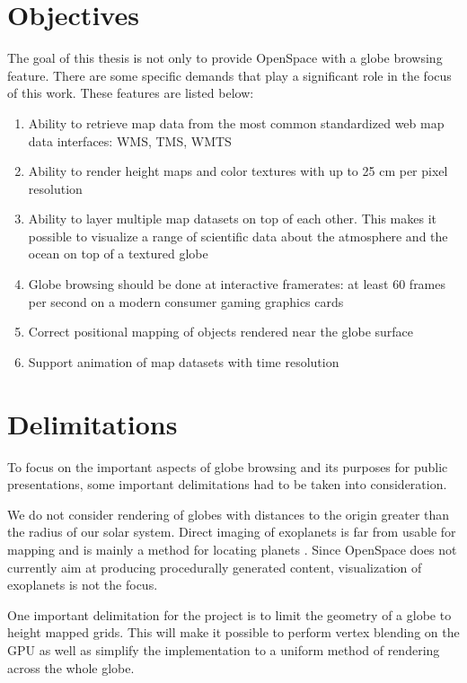 \section{Objectives}

The goal of this thesis is not only to provide OpenSpace with a globe browsing feature. There are some specific demands that play a significant role in the focus of this work. These features are listed below:

\begin{enumerate}
    \item Ability to retrieve map data from the most common standardized web map data interfaces: WMS, TMS, WMTS
    \item Ability to render height maps and color textures with up to 25 cm per pixel resolution
    \item Ability to layer multiple map datasets on top of each other. This makes it possible to visualize a range of scientific data about the atmosphere and the ocean on top of a textured globe
    \item Globe browsing should be done at interactive framerates: at least 60 frames per second on a modern consumer gaming graphics cards
    \item Correct positional mapping of objects rendered near the globe surface
    \item Support animation of map datasets with time resolution
\end{enumerate}

\section{Delimitations}

To focus on the important aspects of globe browsing and its purposes for public presentations, some important delimitations had to be taken into consideration.

We do not consider rendering of globes with distances to the origin greater than the radius of our solar system. Direct imaging of exoplanets is far from usable for mapping and is mainly a method for locating planets \cite{exoplanets}. Since OpenSpace does not currently aim at producing procedurally generated content, visualization of exoplanets is not the focus.

One important delimitation for the project is to limit the geometry of a globe to height mapped grids. This will make it possible to perform vertex blending on the GPU as well as simplify the implementation to a uniform method of rendering across the whole globe.

